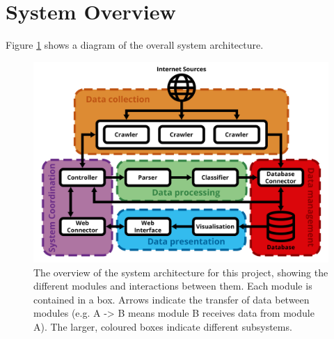 \documentclass{l4proj}
\begin{document}
\section{System Overview}
Figure \ref{fig:system_overview_diagram} shows a diagram of the overall system architecture.
 \begin{figure}[h]
\centering
\includegraphics[width=\textwidth]{images/system_overview_diagram.png}
\caption{The overview of the system architecture for this project, showing the different modules and interactions between them. Each module is contained in a box. Arrows indicate the transfer of data between modules (e.g. A -> B means module B receives data from module A). The larger, coloured boxes indicate different subsystems. }
\label{fig:system_overview_diagram}
\end{figure}
\par
\end{document}
